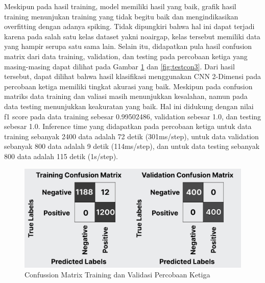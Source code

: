Meskipun pada hasil training, model memiliki hasil yang baik, grafik hasil training menunjukan training yang tidak begitu baik dan mengindikasikan overfitting dengan adanya spiking. Tidak dipungkiri bahwa hal ini dapat terjadi karena pada salah satu kelas dataset yakni noairgap, kelas tersebut memiliki data yang hampir serupa satu sama lain. Selain itu, didapatkan pula hasil confusion matrix dari data training, validation, dan testing pada percobaan ketiga yang masing-masing dapat dilihat pada Gambar \ref{fig:tvcon3} dan \ref{fig:testcon3}. Dari hasil tersebut, dapat dilihat bahwa hasil klasifikasi menggunakan CNN 2-Dimensi pada percobaan ketiga memiliki tingkat akurasi yang baik. Meskipun pada confusion matriks data training dan valiasi masih menunjukkan kesalahan, namun pada data testing menunjukkan keakuratan yang baik. Hal ini didukung dengan nilai f1 score pada data training sebesar 0.99502486, validation sebesar 1.0, dan testing sebesar 1.0. Inference time yang didapatkan pada percobaan ketiga untuk data training sebanyak 2400 data adalah 72 detik (301ms/step), untuk data validation sebanyak 800 data adalah 9 detik (114ms/step), dan untuk data testing sebanyak 800 data adalah 115 detik (1s/step).

\begin{figure} [H] \centering
    \includegraphics[scale=0.3]{gambar/bab4/tvcon3.png}
    \caption{Confussion Matrix Training dan Validasi Percobaan Ketiga}
    \label{fig:tvcon3}
\end{figure}


